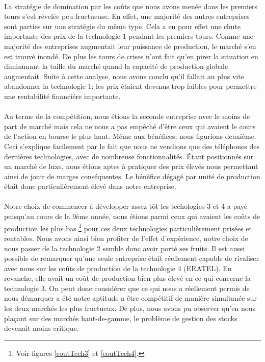 \paragraph{}
La stratégie de domination par les coûts que nous avons menée dans les premiers
tours s'est révelée peu fructueuse. En effet, une majorité des autres 
entreprises sont parties sur une stratégie du même type. Cela a eu pour effet
une chute importante des prix de la technologie 1 pendant les premiers tours. 
Comme une majorité des entreprises augmentait leur puissance de production, 
le marché s'en est trouvé inondé. De plus les tours de crises n'ont fait qu'en 
pirer la situation en diminunant la taille du marché quand la capacité de 
production globale augmentait. Suite à cette analyse, nous avons conclu qu'il 
fallait au plus vite abandonner la technologie 1: les prix étaient devenus trop 
faibles pour permettre une rentabilité financiére importante.

\paragraph{}
Au terme de la compétition, nous étions la seconde entreprise avec le moins de
part de marché mais cela ne nous a pas empêché d'être ceux qui avaient le
cours de l'action en bourse le plus haut. Même aux bénéfices, nous figurions
deuxième. Ceci s'explique facilement par le fait que nous ne vendions que des
téléphones des dernières technologies, avec de nombreuse fonctionnalités.
Étant positionnés sur un marché de luxe, nous étions aptes à pratiquer des
prix élevés nous permettant ainsi de jouir de marges conséquentes. Le bénéfice
dégagé par unité de production était donc particulièrement élevé dans notre
entreprise.

\paragraph{}
Notre choix de commencer à développer assez tôt les techologies 3 et 4 a payé
puisqu'au cours de la 9ème année, nous étions parmi ceux qui avaient les coûts
de production les plus bas
\footnote{Voir figures \ref{coutTech3} et \ref{coutTech4}.}
pour ces deux technologies particulièrement prisées et rentables. Nous avons
ainsi bien profiter de l'effet d'expérience, notre choix de nous passer de la
technologie 2 semble donc avoir porté ses fruits. Il est aussi possible de
remarquer qu'une seule entreprise était réellement capable de rivaliser avec
nous sur les coûts de production de la technologie 4 (ERATEL). En revanche,
elle avait un coût de production bien plus élevé en ce qui concerne la
technologie 3. On peut donc considérer que ce qui nous a réellement permis de
nous démarquer a été notre aptitude a être compétitif de manière simultanée
sur les deux marchés les plus fructueux. De plus, nous avons pu observer qu'en
nous plaçant sur des marchés haut-de-gamme, le problème de gestion des stocks
devenait moins critique.



